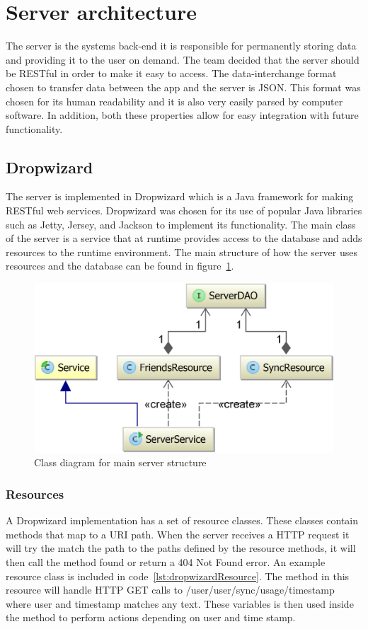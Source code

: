 \label{sec:arch_server}
\section{Server architecture}
The server is the systems back-end it is responsible for permanently storing data and providing it to the user on demand. The team decided that the server should be RESTful in order to make it easy to access. The data-interchange format chosen to transfer data between the app and the server is JSON. This format was chosen for its human readability and it is also very easily parsed by computer software. In addition, both these properties allow for easy integration with future functionality.

\subsection{Dropwizard}
The server is implemented in Dropwizard which is a Java framework for making RESTful web services. Dropwizard was chosen for its use of popular Java libraries such as Jetty, Jersey, and Jackson to implement its functionality. The main class of the server is a service that at runtime provides access to the database and adds resources to the runtime environment. The main structure of how the server uses resources and the database can be found in figure~\ref{fig:classDiagramServer}.

\begin{figure}[H]
\includegraphics[width=\textwidth]{ch/architecture/fig/classDiagramServer.png}
\caption{Class diagram for main server structure}
\label{fig:classDiagramServer}
\end{figure}

\subsubsection{Resources}
A Dropwizard implementation has a set of resource classes. These classes contain methods that map to a URI path. When the server receives a HTTP request it will try the match the path to the paths defined by the resource methods, it will then call the method found or return a 404 Not Found error. An example resource class is included in code~\ref{lst:dropwizardResource}. The method in this resource will handle HTTP GET calls to /user/{user}/sync/usage/{timestamp} where {user} and {timestamp} matches any text. These variables is then used inside the method to perform actions depending on user and time stamp.

